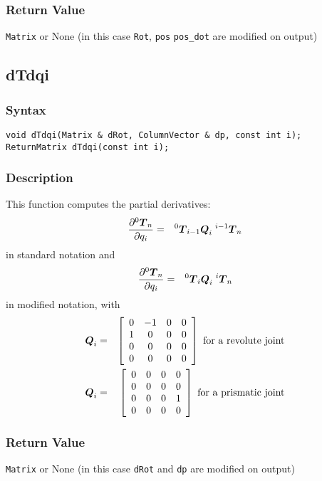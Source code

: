 \documentclass[dvips,11pt,fleqn]{report}
\newcommand{\mbold}[1]{\mbox{\boldmath $ #1 $}}
\newcommand{\matr}[2]{\left[\begin{array}{#1} #2 \end{array}\right]}
\newcommand{\dfdx}[2]{\frac{\partial #1}{\partial #2}}
\begin{document}
\subsubsection*{Return Value}
{\tt Matrix} or None (in this case {\tt Rot}, {\tt pos} {\tt pos\_dot} are modified on output)
\newpage 

\subsection*{dTdqi}
\subsubsection*{Syntax}
\begin{verbatim}
void dTdqi(Matrix & dRot, ColumnVector & dp, const int i);
ReturnMatrix dTdqi(const int i);
\end{verbatim}
\subsubsection*{Description}
This function computes the partial derivatives:
\begin{eqnarray}
\dfdx{{}^0 \mbold{T}_n}{q_i} & = & {}^0 \mbold{T}_{i-1} \mbold{Q}_i \; {}^{i-1} \mbold{T}_n
\end{eqnarray}
in standard notation and
\begin{eqnarray}
  \dfdx{{}^0 \mbold{T}_n}{q_i} 
  & = & {}^0 \mbold{T}_{i} \mbold{Q}_i \; {}^{i} \mbold{T}_n
\end{eqnarray}
in modified notation, with
\begin{eqnarray}
\mbold{Q}_i & = & \matr{cccc}{
0 & -1 & 0 & 0 \\
1 & 0 & 0 & 0 \\
0 & 0 & 0 & 0 \\
0 & 0 & 0 & 0} \mbox{ for a revolute joint} \\
\mbold{Q}_i & = & \matr{cccc}{
0 & 0 & 0 & 0 \\
0 & 0 & 0 & 0 \\
0 & 0 & 0 & 1 \\
0 & 0 & 0 & 0} \mbox{ for a prismatic joint} 
\end{eqnarray}


\subsubsection*{Return Value}

{\tt Matrix} or None (in this case {\tt dRot} and {\tt dp} are modified on output)
\end{document}
